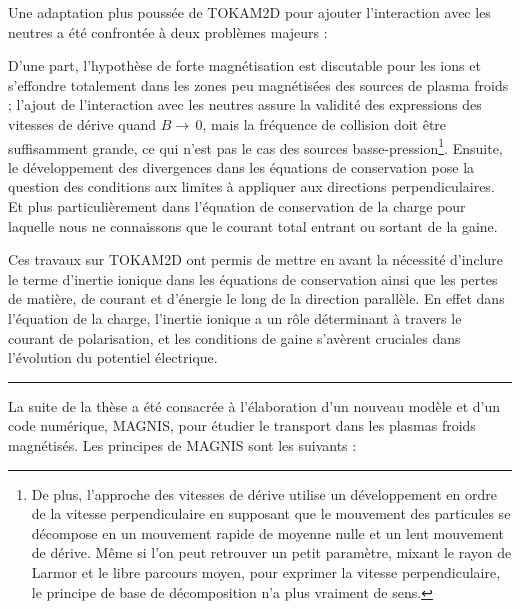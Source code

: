 Une adaptation plus poussée de TOKAM2D pour ajouter l'interaction avec les
neutres a été confrontée à deux problèmes majeurs : 

D'une part, l'hypothèse de
forte magnétisation est discutable pour les ions et s'effondre totalement dans les
zones peu magnétisées des sources de plasma froids ; l'ajout de l'interaction
avec les neutres assure la validité des expressions des vitesses de dérive
quand $B\rightarrow\,$0, mais la fréquence de collision doit être suffisamment
grande, ce qui n'est pas le cas des sources basse-pression\footnote{De plus, l'approche
des vitesses de dérive utilise un développement en ordre de la vitesse
perpendiculaire en supposant que le mouvement des particules se décompose en un
mouvement rapide de moyenne nulle et un lent mouvement de dérive. Même si
l'on peut retrouver un petit paramètre, mixant le rayon de Larmor et le libre
parcours moyen, pour exprimer la vitesse perpendiculaire, le principe de base
de décomposition n'a plus vraiment de sens.}.
Ensuite, le
développement des divergences dans les équations de conservation pose la
question des conditions aux limites à appliquer aux directions perpendiculaires.
 Et plus particulièrement dans l'équation de conservation de la charge pour
 laquelle nous ne connaissons que le courant total entrant ou sortant de la
 gaine. 
   
 Ces travaux sur TOKAM2D ont permis de mettre en avant la nécessité d'inclure
 le terme d'inertie ionique dans les équations de conservation ainsi que les pertes de
 matière, de courant et d'énergie le long de la direction parallèle. En effet
 dans l'équation de la charge, l'inertie ionique a un rôle déterminant à travers
 le courant de polarisation, et les conditions de gaine s'avèrent cruciales
 dans l'évolution du potentiel électrique.
 
 \begin{center}
\rule{0.6\textwidth}{1pt}
\end{center}
 
 La suite de la thèse a été consacrée à l'élaboration d'un
 nouveau modèle et d'un code numérique, MAGNIS, pour étudier le transport
 dans les plasmas froids magnétisés. Les principes de MAGNIS sont les suivants :
 
